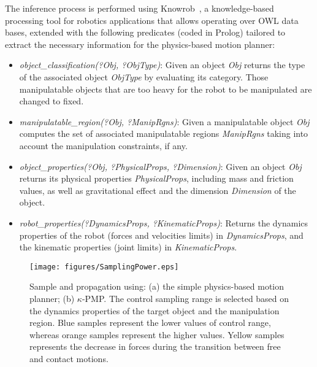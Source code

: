 \documentclass[twocolumn]{svjour3}          %
\begin{document}
The inference process is performed using Knowrob~\cite{knowrob2009}, a knowledge-based processing tool for robotics applications that allows operating over OWL data bases, extended with the following predicates (coded in Prolog) tailored to extract the necessary information for the physics-based motion planner:
\begin{itemize}
\item \textit{object\_classification(?Obj, ?ObjType)}: Given an object \textit{Obj} returns the type of the associated object \textit{ObjType} by evaluating its category. Those manipulatable objects 
that are too heavy for the robot to be manipulated are changed to fixed.

\item \textit{manipulatable\_region(?Obj, ?ManipRgns)}: Given a manipulatable object \textit{Obj} computes the set of  associated manipulatable regions \textit{ManipRgns} taking into account the 
manipulation constraints, if any.
\item \textit{object\_properties(?Obj, ?PhysicalProps, ?Dimension)}: Given an object \textit{Obj} returns its physical properties \textit{PhysicalProps}, including mass and friction values, as well as 
gravitational effect  and the dimension \textit{Dimension} of the object.

\item \textit{robot\_properties(?DynamicsProps, ?KinematicProps)}: Returns the dynamics properties of the robot (forces and velocities limits) in \textit{DynamicsProps}, and the kinematic properties 
(joint limits) in \textit{KinematicProps}.
\end{itemize}
\begin{figure}[t]
\begin{center}
   \texttt{[image: figures/SamplingPower.eps]}
   \caption{Sample and propagation using: (a) the simple
physics-based motion planner; (b) $\kappa$-PMP. The control sampling range is selected based on the dynamics properties of the target object and the manipulation
region. Blue samples represent the lower values of control range, whereas orange samples represent the higher values. Yellow samples represents the decrease
in forces during the transition between free and contact motions.
}\label{sampling}
\end{center}
\end{figure}

\end{document}
